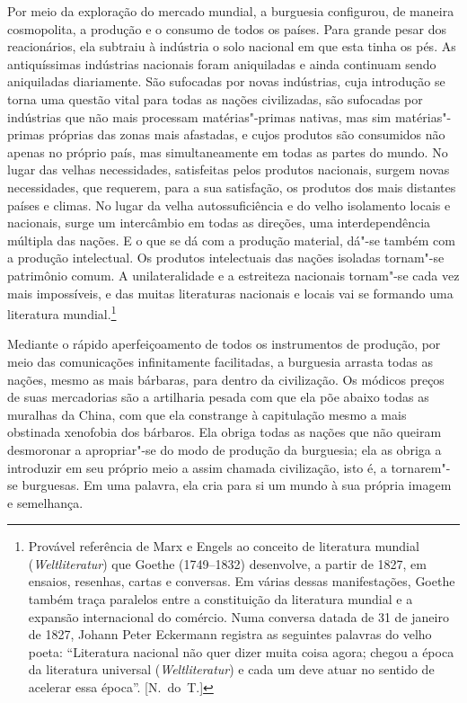 Por meio da exploração do mercado mundial, a burguesia       \label{5}
configurou, de maneira cosmopolita, a produção e o consumo de todos os
países. Para grande pesar dos reacionários, ela subtraiu à indústria o
solo nacional em que esta tinha os pés. As antiquíssimas indústrias
nacionais foram aniquiladas e ainda continuam sendo aniquiladas
diariamente. São sufocadas por novas indústrias, cuja introdução se
torna uma questão vital para todas as nações civilizadas, são sufocadas
por indústrias que não mais processam matérias"-primas nativas, mas
sim matérias"-primas próprias das zonas mais afastadas, e cujos
produtos são consumidos não apenas no próprio país, mas simultaneamente
em todas as partes do mundo. No lugar das velhas necessidades,
satisfeitas pelos produtos nacionais, surgem novas necessidades, que
requerem, para a sua satisfação, os produtos dos mais distantes
países e climas. No lugar da velha autossuficiência e do velho
isolamento locais e nacionais, surge um intercâmbio em todas as
direções, uma interdependência múltipla das nações. E o que se dá com a
produção material, dá"-se também com a produção intelectual. Os
produtos intelectuais das nações isoladas tornam"-se patrimônio comum.
A unilateralidade e a estreiteza nacionais tornam"-se cada vez mais
impossíveis, e das muitas literaturas nacionais e locais vai se
formando uma literatura
mundial.\footnote{ Provável referência de Marx e 
Engels ao conceito de literatura mundial (\textit{Weltliteratur}) que
Goethe (1749--1832) desenvolve, a partir de 1827, em ensaios,
resenhas, cartas e conversas. Em várias dessas manifestações, Goethe
também traça paralelos entre a constituição da literatura mundial e a
expansão internacional do comércio. Numa conversa datada de 31 de
janeiro de 1827, Johann Peter Eckermann registra as seguintes palavras
do velho poeta: “Literatura nacional não quer dizer muita coisa agora;
chegou a época da literatura universal (\textit{Weltliteratur}) e cada
um deve atuar no sentido de acelerar essa época”.  [N.~do~T.]}

Mediante o rápido aperfeiçoamento de todos os instrumentos de produção,
por meio das comunicações infinitamente facilitadas, a burguesia
arrasta todas as nações, mesmo as mais bárbaras, para dentro da
civilização. Os módicos preços de suas mercadorias são a artilharia
pesada com que ela põe abaixo todas as muralhas da China, com que ela
constrange à capitulação mesmo a mais obstinada xenofobia dos bárbaros.
Ela obriga todas as nações que não queiram desmoronar a apropriar"-se
do modo de produção da burguesia; ela as obriga a introduzir em seu
próprio meio a assim chamada civilização, isto é, a tornarem"-se
burguesas. Em uma palavra, ela cria para si um mundo à sua própria
imagem e semelhança.                

